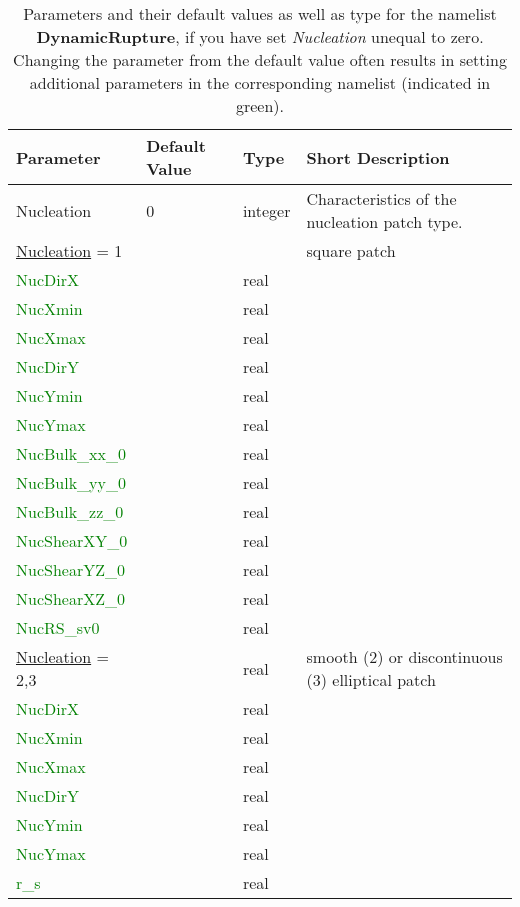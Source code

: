 \documentclass[12pt,twoside]{article}
\begin{document}
\begin{table}[H]
\caption{Parameters and their default values as well as type for the namelist \textbf{DynamicRupture},
         if you have set \textit{Nucleation} unequal to zero.
         Changing the parameter from the default value often results in setting additional parameters
         in the corresponding namelist (indicated in green).}
\begin{center}
\begin{tabular}{|p{4.8cm}|p{2.4cm}|p{2cm}|p{5cm}|}
\hline
Parameter & Default Value & Type & Short Description \\
\hline
\hline
Nucleation & 0 & integer & Characteristics of the nucleation patch type.\\
\hline
\uline{Nucleation} = 1 & & & square patch\\
\hdashline
\textcolor{green}{NucDirX} & & real & \\
\textcolor{green}{NucXmin} & & real & \\
\textcolor{green}{NucXmax} & & real & \\
\textcolor{green}{NucDirY} & & real & \\
\textcolor{green}{NucYmin} & & real & \\
\textcolor{green}{NucYmax} & & real & \\
\textcolor{green}{NucBulk\_xx\_0} & & real & \\
\textcolor{green}{NucBulk\_yy\_0} & & real & \\
\textcolor{green}{NucBulk\_zz\_0} & & real & \\
\textcolor{green}{NucShearXY\_0} & & real & \\
\textcolor{green}{NucShearYZ\_0} & & real & \\
\textcolor{green}{NucShearXZ\_0} & & real & \\
\textcolor{green}{NucRS\_sv0} & & real & \\
\hline
\uline{Nucleation} = 2,3 & & real & smooth (2) or discontinuous (3) elliptical patch\\
\textcolor{green}{NucDirX} & & real & \\
\textcolor{green}{NucXmin} & & real & \\
\textcolor{green}{NucXmax} & & real & \\
\textcolor{green}{NucDirY} & & real & \\
\textcolor{green}{NucYmin} & & real & \\
\textcolor{green}{NucYmax} & & real & \\
\textcolor{green}{r\_s} & & real & \\

\end{tabular}
\end{center}
\end{table}
\end{document}
